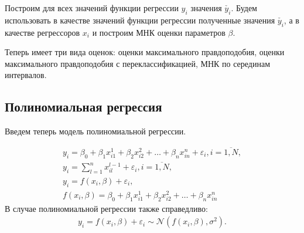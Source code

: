 Построим для всех значений функции регрессии $y_i$ значения $\check{y_i}$.
Будем использовать в качестве значений функции регрессии полученные значения $\check{y_i}$, а в качестве регрессоров $x_i$ и построим МНК оценки параметров $\beta$.

Теперь имеет три вида оценок: оценки максимального правдоподобия, оценки максимального правдоподобия с переклассификацией, МНК по серединам интервалов. 
\newpage
\subsection{Полиномиальная регрессия}
Введем теперь модель полиномиальной регрессии.

\begin{equation}
    \begin{array}{c}
        \label{eq28}y_i=\beta_0+\beta_1 x_{i1}^1+\beta_2 x_{i2}^2+\dots+\beta_n x_{in}^n+\varepsilon_i, i=\overline{1,N},\\
        y_i = \sum\limits_{l=1}^{n} x_{il}^{l-1} + \varepsilon_i, i=\overline{1,N},\\
        y_i= f(x_i,\beta)+\varepsilon_i,\\
        f(x_i,\beta)=\beta_0+\beta_1 x_{i1}^1+\beta_2 x_{i2}^2+\dots+\beta_n x_{in}^n
    \end{array}
\end{equation}
В случае полиномиальной регрессии также справедливо:
\begin{eqnarray}
    y_i=f(x_i,\beta)+\varepsilon_i \sim \mathcal{N}(f(x_i,\beta),\sigma^2).
\end{eqnarray}

